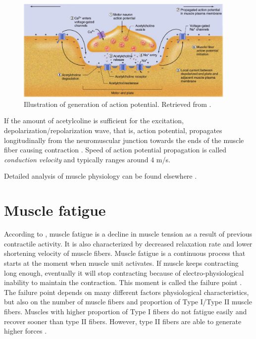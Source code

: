 \begin{figure}[ht]
\centering
\includegraphics[width=0.95\textwidth]{Images/introduction/action_potential_generation.png}
\caption{Illustration of generation of action potential. Retrieved from \citep{Widmaier2014}.}
\label{fig:action_potential_generation}
\end{figure}
  
If the amount of acetylcoline is sufficient for the excitation, depolarization/repolarization wave, that is, action potential, propagates longitudinally from the neuromuscular junction towards the ends of the muscle fiber causing contraction \citep{Henneberg1999}. Speed of action potential propagation is called \emph{conduction velocity} and typically ranges around 4 m/s.

Detailed analysis of muscle physiology can be found elsewhere \citep{Squire1986, Widmaier2014}.



\section{Muscle fatigue} \label{sc:fatigue}

According to \citet{Widmaier2014}, muscle fatigue is a decline in muscle tension as a result of previous contractile activity. It is also characterized by decreased relaxation rate and lower shortening velocity of muscle fibers. Muscle fatigue is a continuous process that starts at the moment when muscle unit activates. If muscle keeps contracting long enough, eventually it will stop contracting because of electro-physiological inability to maintain the contraction. This moment is called the failure point \citep{DeLuca1984}. The failure point depends on many different factors physiological characteristics, but also on the number of muscle fibers and proportion of Type I/Type II muscle fibers. Muscles with higher proportion of Type I fibers do not fatigue easily and recover sooner than type II fibers. However, type II fibers are able to generate higher forces \citep{Kupa1995}.

